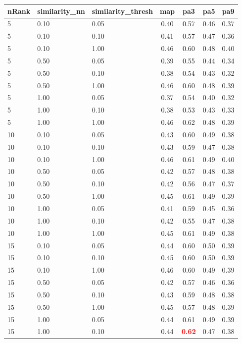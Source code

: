   
\begin{table} 
\begin{center} 
\scriptsize 
 \setlength{\tabcolsep}{.16667em} 
\begin{tabular}{lllcccc} 
nRank & similarity\_nn & similarity\_thresh & map & pa3 & pa5 & pa9 \\ 
\hline 
 5 & 0.10 & 0.05 & 0.40 & 0.57 & 0.46 & 0.37 \\ 
 5 & 0.10 & 0.10 & 0.41 & 0.57 & 0.47 & 0.36 \\ 
 5 & 0.10 & 1.00 & 0.46 & 0.60 & 0.48 & 0.40 \\ 
 5 & 0.50 & 0.05 & 0.39 & 0.55 & 0.44 & 0.34 \\ 
 5 & 0.50 & 0.10 & 0.38 & 0.54 & 0.43 & 0.32 \\ 
 5 & 0.50 & 1.00 & 0.46 & 0.60 & 0.48 & 0.39 \\ 
 5 & 1.00 & 0.05 & 0.37 & 0.54 & 0.40 & 0.32 \\ 
 5 & 1.00 & 0.10 & 0.38 & 0.53 & 0.43 & 0.33 \\ 
 5 & 1.00 & 1.00 & 0.46 & 0.62 & 0.48 & 0.39 \\ 
10 & 0.10 & 0.05 & 0.43 & 0.60 & 0.49 & 0.38 \\ 
10 & 0.10 & 0.10 & 0.43 & 0.59 & 0.47 & 0.38 \\ 
10 & 0.10 & 1.00 & 0.46 & 0.61 & 0.49 & 0.40 \\ 
10 & 0.50 & 0.05 & 0.42 & 0.57 & 0.48 & 0.38 \\ 
10 & 0.50 & 0.10 & 0.42 & 0.56 & 0.47 & 0.37 \\ 
10 & 0.50 & 1.00 & 0.45 & 0.61 & 0.49 & 0.39 \\ 
10 & 1.00 & 0.05 & 0.41 & 0.59 & 0.45 & 0.36 \\ 
10 & 1.00 & 0.10 & 0.42 & 0.55 & 0.47 & 0.38 \\ 
10 & 1.00 & 1.00 & 0.45 & 0.61 & 0.49 & 0.38 \\ 
15 & 0.10 & 0.05 & 0.44 & 0.60 & 0.50 & 0.39 \\ 
15 & 0.10 & 0.10 & 0.45 & 0.60 & 0.50 & 0.39 \\ 
15 & 0.10 & 1.00 & 0.46 & 0.60 & 0.49 & 0.39 \\ 
15 & 0.50 & 0.05 & 0.42 & 0.57 & 0.46 & 0.36 \\ 
15 & 0.50 & 0.10 & 0.43 & 0.59 & 0.48 & 0.38 \\ 
15 & 0.50 & 1.00 & 0.45 & 0.57 & 0.48 & 0.39 \\ 
15 & 1.00 & 0.05 & 0.44 & 0.61 & 0.49 & 0.39 \\ 
15 & 1.00 & 0.10 & 0.44 & \textbf{\textcolor{red}{0.62}} & 0.47 & 0.38 \\ 

\end{tabular}
\end{center}
\end{table}

